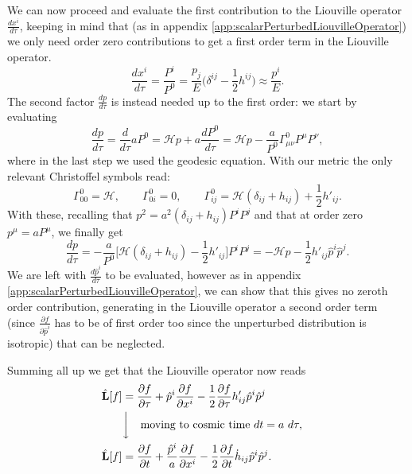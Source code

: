 We can now proceed and evaluate the first contribution to the Liouville operator $\frac{dx^i}{d\tau}$, keeping in mind that (as in appendix \ref{app:scalarPerturbedLiouvilleOperator}) we only need order zero contributions to get a first order term in the Liouville operator.
\begin{equation}\label{eq:B.4}
    \frac{dx^i}{d\tau}=\frac{P^i}{P^0}=\frac{p_j}{E}\bigg(\delta^{ij}-\frac{1}{2}h^{ij}\bigg)\approx\frac{p^i}{E}.
\end{equation}
The second factor $\tfrac{dp}{d\tau}$ is instead needed up to the first order: we start by evaluating
$$\frac{dp}{d\tau}=\frac{d}{d\tau}aP^0=\mathcal{H} p+a\frac{dP^0}{d\tau}=\mathcal{H} p-\frac{a}{P^0}\Gamma^0_{\mu\nu}P^\mu P^\nu,$$
where in the last step we used the geodesic equation. With our metric the only relevant Christoffel symbols read:
$$\Gamma^0_{00}=\mathcal{H},\qquad \Gamma^0_{0i}=0,\qquad\Gamma^{0}_{ij}=\mathcal{H} (\delta_{ij}+h_{ij})+\frac{1}{2}h'_{ij}.$$
With these, recalling that $p^2=a^2(\delta_{ij}+h_{ij})P^i P^j$ and that at order zero $p^\mu=aP^\mu$, we finally get
\begin{equation}\label{eq:B.5}
   \frac{dp}{d\tau}=-\frac{a}{P^0}\bigg[\mathcal{H} (\delta_{ij}+h_{ij})-\frac{1}{2}h'_{ij}\bigg]P^i P^j=-\mathcal{H}p-\frac{1}{2}h'_{ij}\hat p^i\hat p^j.
\end{equation}
We are left with $\frac{d\hat p^i}{d\tau}$ to be evaluated, however as in appendix \ref{app:scalarPerturbedLiouvilleOperator}, we can show that this gives no zeroth order contribution, generating in the Liouville operator a second order term (since $\frac{\partial f}{\partial\hat p^i}$ has to be of first order too since the unperturbed distribution is isotropic) that can be neglected.

Summing all up we get that the Liouville operator now reads
\begin{align}\label{eq:tensorPerturbedLiouvilleOperator}
   \hat{\mathbf{L}}[f]&=\frac{\partial f}{\partial\tau}+\hat p^i\frac{\partial f}{\partial x^i}-\frac{1}{2}\frac{\partial f}{\partial \tau}h'_{ij}\hat p^i\hat p^j\nonumber&&\\
   &\bigg\downarrow\quad\text{moving to cosmic time } dt=a\ d\tau,\nonumber&&\\
   \hat{\mathbf{L}}[f]&=\frac{\partial f}{\partial t}+\frac{\hat p^i}{a}\frac{\partial f}{\partial x^i}-\frac{1}{2}\frac{\partial f}{\partial t}\dot{h}_{ij}\hat p^i\hat p^j.&&
\end{align}